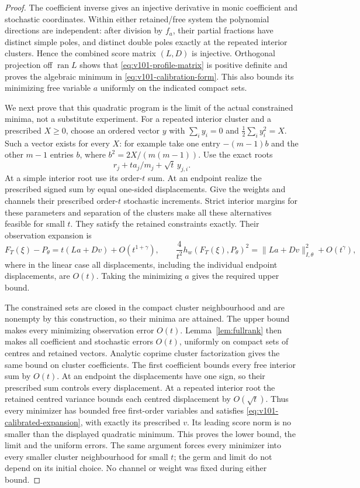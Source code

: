 \begin{proof}
The coefficient inverse gives an injective derivative in monic
coefficient and stochastic coordinates. Within either retained/free
system the polynomial directions are independent: after division by
$f_a$, their partial fractions have distinct simple poles, and distinct
double poles exactly at the repeated interior clusters. Hence the
combined score matrix $(L,D)$ is injective. Orthogonal projection off
$\operatorname{ran}L$ shows that \eqref{eq:v101-profile-matrix} is
positive definite and proves the algebraic minimum in
\eqref{eq:v101-calibration-form}. This also bounds its minimizing free
variable $a$ uniformly on the indicated compact sets.

We next prove that this quadratic program is the limit of the actual
constrained minima, not a substitute experiment. For a repeated
interior cluster and a prescribed $X\ge0$, choose an ordered vector
$y$ with $\sum_i y_i=0$ and $\frac12\sum_i y_i^2=X$. Such a vector
exists for every $X$: for example take one entry $-(m-1)b$ and the
other $m-1$ entries $b$, where $b^2=2X/(m(m-1))$. Use the exact roots
\[
 r_j+t a_j/m_j+\sqrt t\,y_{j,i}.
\]
At a simple interior root use its order-$t$ sum. At an endpoint realize
the prescribed signed sum by equal one-sided displacements. Give the
weights and channels their prescribed order-$t$ stochastic increments.
Strict interior margins for these parameters and separation of the
clusters make all these alternatives feasible for small $t$. They
satisfy the retained constraints exactly. Their observation expansion is
\begin{equation}\label{eq:v101-calibrated-expansion}
 F_T(\xi)-P_\theta=t(La+Dv)+O(t^{1+\gamma}),\qquad
 \frac4{t^2}h_w(F_T(\xi),P_\theta)^2
       =\|La+Dv\|_{I,\theta}^2+O(t^\gamma),
\end{equation}
where in the linear case all displacements, including the individual
endpoint displacements, are $O(t)$. Taking the minimizing $a$ gives
the required upper bound.

The constrained sets are closed in the compact cluster neighbourhood
and are nonempty by this construction, so their minima are attained.
The upper bound makes every minimizing observation error $O(t)$.
Lemma~\ref{lem:fullrank} then makes all coefficient and stochastic
errors $O(t)$, uniformly on compact sets of centres and retained
vectors. Analytic coprime cluster factorization gives the same bound
on cluster coefficients. The first coefficient bounds every free
interior sum by $O(t)$. At an endpoint the displacements have one
sign, so their prescribed sum controls every displacement. At a
repeated interior root the retained centred variance bounds each
centred displacement by $O(\sqrt t)$. Thus every minimizer has bounded
free first-order variables and satisfies
\eqref{eq:v101-calibrated-expansion}, with exactly its prescribed $v$.
Its leading score norm is no smaller than the displayed quadratic
minimum. This proves the lower bound, the limit and the uniform errors.
The same argument forces every minimizer into every smaller cluster
neighbourhood for small $t$; the germ and limit do not depend on its
initial choice. No channel or weight was fixed during either bound.


\end{proof}
